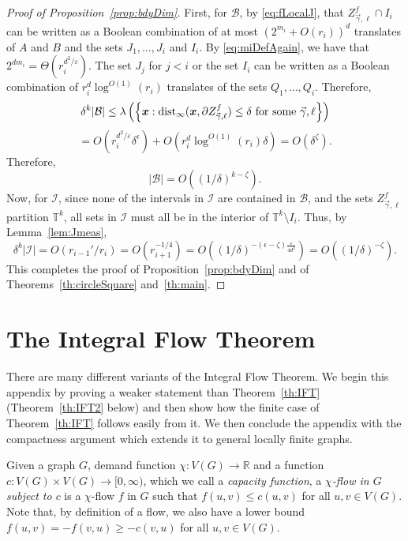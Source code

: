 \documentclass[12pt,a4paper]{amsart}
\numberwithin{equation}{section}
\theoremstyle{definition}
\begin{document}
\begin{proof}[Proof of Proposition~\ref{prop:bdyDim}]
First, for $\mathcal{B}$, by \eqref{eq:fLocalJ}, that $Z_{\vec{\gamma},\ell}^f\cap I_i$ can be written as a Boolean combination of at most $\left(2^{m_i}+O(r_i)\right)^d$ translates of $A$ and $B$ and the sets $J_1,\dots,J_i$ and $I_i$. By \eqref{eq:miDefAgain}, we have that $2^{dm_i}=\Theta(r_i^{d^2/\varepsilon})$. The set $J_j$ for $j<i$ or the set $I_i$ can be written as a Boolean combination of $r_i^d\log^{O(1)}(r_i)$ translates of the sets $Q_1,\dots,Q_i$. Therefore,
\[\delta^k|\mathcal{B}|\leq \lambda\left(\left\{\boldsymbol{x}: \operatorname{dist}_\infty(\boldsymbol{x},\partial Z_{\vec{\gamma},\ell}^f)\leq \delta\text{ for some }\vec{\gamma},\ell\right\}\right)\]
\[=O\left(r_i^{d^2/\varepsilon}\delta^{\epsilon}\right) + O\left(r_i^d\log^{O(1)}(r_i)\delta\right)=O\left(\delta^{\zeta}\right).\]
Therefore,
\[|\mathcal{B}|=O\left( (1/\delta)^{k-\zeta}\right).\]
Now, for $\mathcal{I}$, since none of the intervals in $\mathcal{I}$ are contained in $\mathcal{B}$, and the sets $Z_{\vec{\gamma},\ell}^f$ partition $\mathbb{T}^k$, all sets in $\mathcal{I}$ must all be in the interior of $\mathbb{T}^k\setminus I_i$. Thus, by Lemma~\ref{lem:Jmeas},
\[\delta^k|\mathcal{I}| = O(r_{i-1}'/r_i)=O\left(r_{i+1}^{-1/4}\right) = O\left((1/\delta)^{-(\epsilon-\zeta)\frac{\varepsilon}{4d^2}}\right)=O\left((1/\delta)^{-\zeta}\right).\]
This completes the proof of Proposition~\ref{prop:bdyDim} and of Theorems~\ref{th:circleSquare} and~\ref{th:main}.
\end{proof}

\DeclareRobustCommand{\VON}[3]{#3}


\appendix

\section{The Integral Flow Theorem}
\label{app:IFT}

There are many different variants of the Integral Flow Theorem. We begin this appendix by proving a weaker statement than Theorem~\ref{th:IFT} (Theorem~\ref{th:IFT2} below) and then show how the finite case of Theorem~\ref{th:IFT} follows easily from it. We then conclude the appendix with the compactness argument which extends it to general locally finite graphs. 

Given a graph $G$, demand function $\chi:V(G)\to \mathbb{R}$ and a function $c:V(G)\times V(G)\to [0,\infty)$, which we call a \emph{capacity function}, a \emph{$\chi$-flow in $G$ subject to $c$} is a $\chi$-flow $f$ in $G$ such that $f(u,v)\leq c(u,v)$ for all $u,v\in V(G)$. Note that, by definition of a flow, we also have a lower bound $f(u,v)=-f(v,u)\geq -c(v,u)$ for all $u,v\in V(G)$.
\end{document}
